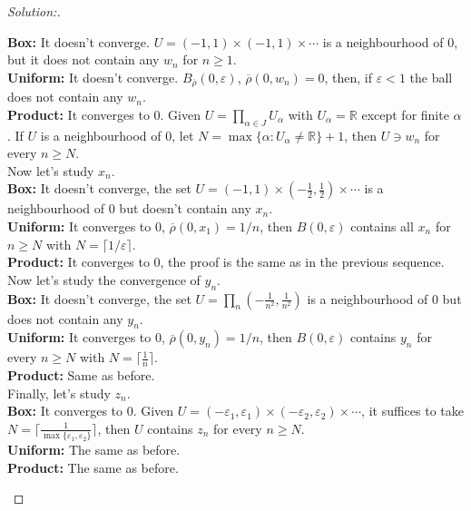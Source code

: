 \documentclass[a4paper,12pt, reqno]{article}
\theoremstyle{definition}
\newenvironment{solution}{\begin{proof}[Solution:]}{\end{proof}}
\newcommand{\R}{\mathbb{R}}
\begin{document}
\begin{solution}
\begin{enumerate}[label=(\alph*)]
          \textbf{Box:} It doesn't converge. $U = (-1,1)\times(-1,1)\times\cdots$ is a neighbourhood of $0$, but it does not contain any $w_{n}$ for $n\geq 1$.\\
          \textbf{Uniform:} It doesn't converge. $B_{\overline{\rho}}(0,\varepsilon)$, $\overline{\rho}(0,w_{n})=0$, then, if $\varepsilon<1$ the ball does not contain any $w_{n}$.\\
          \textbf{Product:} It converges to $0$. Given $U = \prod_{\alpha\in J}U_{\alpha}$ with $U_{\alpha} = \R$ except for finite $\alpha$. If $U$ is a neighbourhood of $0$, let $N = \max\{ \alpha: U_{\alpha}\neq\R  \}+1$, then $U\ni w_{n}$ for every $n\geq N$.\\

          Now let's study $x_{n}$.\\

          \textbf{Box:} It doesn't converge, the set $U = (-1,1)\times(-\frac{1}{2},\frac{1}{2})\times\cdots$ is a neighbourhood of $0$ but doesn't contain any $x_{n}$.\\
          \textbf{Uniform:} It converges to $0$, $\overline{\rho}(0,x_{1}) = 1/n$, then $B(0,\varepsilon)$ contains all $x_{n}$ for $n\geq N$ with $N = \lceil1/\varepsilon\rceil$.\\
          \textbf{Product:} It converges to $0$, the proof is the same as in the previous sequence.\\

          Now let's study the convergence of $y_{n}$.\\

          \textbf{Box:} It doesn't converge, the set $U = \prod_{n}(-\frac{1}{n^2},\frac{1}{n^2})$ is a neighbourhood of $0$ but does not contain any $y_{n}$.\\
          \textbf{Uniform:} It converges to $0$, $\overline{\rho}(0,y_{n}) =1/n$, then $B(0,\varepsilon)$ contains $y_{n}$ for every $n\geq N$ with $N = \lceil \frac{1}{n}\rceil$.\\
          \textbf{Product:} Same as before.\\

          Finally, let's study $z_{n}$.\\

          \textbf{Box:} It converges to $0$. Given $U = (-\varepsilon_{1},\varepsilon_{1})\times(-\varepsilon_{2},\varepsilon_{2})\times \cdots$, it suffices to take $N = \lceil \frac{1}{\max\{ \varepsilon_{1},\varepsilon_{2} \}}\rceil$, then $U$ contains $z_{n}$ for every $n\geq N$.\\
          \textbf{Uniform:} The same as before.\\
          \textbf{Product:} The same as before.
  \end{enumerate}
\end{solution}
\end{document}
